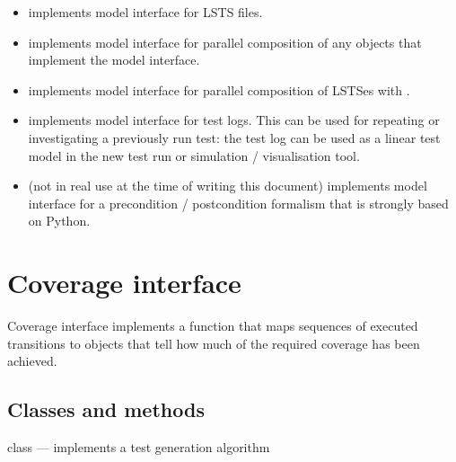\documentclass{article}
\begin{document}
\begin{itemize}
\item {} implements model interface for LSTS
  files.
\item {} implements model interface for
  parallel composition of any objects that implement the model
  interface.
\item {} implements model interface for
  parallel composition of LSTSes with .
\item {} implements model interface for
  test logs. This can be used for repeating or investigating a
  previously run test: the test log can be used as a linear test model
  in the new test run or simulation / visualisation tool.
\item (not in real use at the time of writing this document)
   implements model interface for a
  precondition / postcondition formalism that is strongly based on
  Python.
\end{itemize}

\section{Coverage interface}

Coverage interface implements a function that maps sequences of
executed transitions to objects that tell how much of the required
coverage has been achieved.

\subsection{Classes and methods}

\noindent{} class --- implements a test generation
algorithm
 
\end{document}
